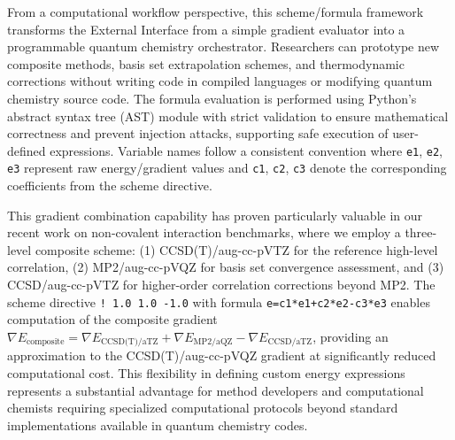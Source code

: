 From a computational workflow perspective, this scheme/formula framework transforms the External Interface from a simple gradient evaluator into a programmable quantum chemistry orchestrator. Researchers can prototype new composite methods, basis set extrapolation schemes, and thermodynamic corrections without writing code in compiled languages or modifying quantum chemistry source code. The formula evaluation is performed using Python's abstract syntax tree (AST) module with strict validation to ensure mathematical correctness and prevent injection attacks, supporting safe execution of user-defined expressions. Variable names follow a consistent convention where \texttt{e1}, \texttt{e2}, \texttt{e3} represent raw energy/gradient values and \texttt{c1}, \texttt{c2}, \texttt{c3} denote the corresponding coefficients from the scheme directive.

This gradient combination capability has proven particularly valuable in our recent work on non-covalent interaction benchmarks, where we employ a three-level composite scheme: (1) CCSD(T)/aug-cc-pVTZ for the reference high-level correlation, (2) MP2/aug-cc-pVQZ for basis set convergence assessment, and (3) CCSD/aug-cc-pVTZ for higher-order correlation corrections beyond MP2. The scheme directive \texttt{! 1.0 1.0 -1.0} with formula \texttt{e=c1*e1+c2*e2-c3*e3} enables computation of the composite gradient $\nabla E_{\text{composite}} = \nabla E_{\text{CCSD(T)/aTZ}} + \nabla E_{\text{MP2/aQZ}} - \nabla E_{\text{CCSD/aTZ}}$, providing an approximation to the CCSD(T)/aug-cc-pVQZ gradient at significantly reduced computational cost. This flexibility in defining custom energy expressions represents a substantial advantage for method developers and computational chemists requiring specialized computational protocols beyond standard implementations available in quantum chemistry codes.
